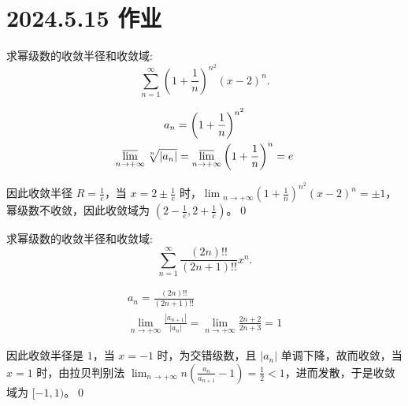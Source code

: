 \ifx\allfiles\undefined

\date{}
\author{尹锦润}

\maketitle
\fi

\section{2024.5.15 作业}

\begin{ques}
	求幂级数的收敛半径和收敛域:
\begin{equation*}
	\sum _{n=1}^{\infty }\left( 1+\frac{1}{n}\right)^{n^{2}} (x-2)^{n} .
\end{equation*}
\end{ques}

\begin{gather*}
	a_{n} =\left( 1+\frac{1}{n}\right)^{n^{2}}\\
	\varlimsup _{n\rightarrow +\infty }\sqrt[n]{|a_{n} |} =\varlimsup _{n\rightarrow +\infty }\left( 1+\frac{1}{n}\right)^{n} =e
\end{gather*}

因此收敛半径 $\displaystyle R=\frac{1}{e}$，当 $\displaystyle x=2\pm \frac{1}{e}$ 时，$\displaystyle \lim{}_{n\rightarrow +\infty }\left( 1+\frac{1}{n}\right)^{n^{2}}( x-2)^{n} =\pm 1$，幂级数不收敛，因此收敛域为 $\displaystyle \left( 2-\frac{1}{e} ,2+\frac{1}{e}\right)$。\qed 







\begin{ques}
	求幂级数的收敛半径和收敛域:
\begin{equation*}
	\sum _{n=1}^{\infty }\frac{(2n)!!}{(2n+1)!!} x^{n} .
\end{equation*}
\end{ques}

\begin{gather*}
	a_{n} =\frac{(2n)!!}{(2n+1)!!}\\
	\lim _{n\rightarrow +\infty }\frac{|a_{n+1} |}{|a_{n} |} =\lim _{n\rightarrow +\infty }\frac{2n+2}{2n+3} =1
\end{gather*}

因此收敛半径是 $\displaystyle 1$，当 $\displaystyle x=-1$ 时，为交错级数，且 $\displaystyle |a_{n} |$ 单调下降，故而收敛，当 $\displaystyle x=1$ 时，由拉贝判别法 $\displaystyle \lim _{n\rightarrow +\infty } n\left(\frac{a_{n}}{a_{n+1}} -1\right) =\frac{1}{2} < 1$，进而发散，于是收敛域为 $\displaystyle [ -1,1)$。\qed 



